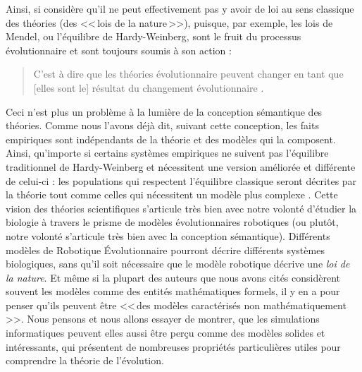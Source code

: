 Ainsi, si \cite{beatty1980whatswrongwithreceivedwiew} considère qu'il ne peut effectivement pas y avoir de loi au sens classique des théories (des <<\,lois de la nature\,>>), puisque, par exemple, les lois de Mendel, ou l'équilibre de Hardy-Weinberg, sont le fruit du processus évolutionnaire et sont toujours soumis à son action :
\begin{quote}
	C'est à dire que les théories évolutionnaire peuvent changer en tant que [elles sont le] résultat du changement évolutionnaire \citep[p.~407]{beatty1980whatswrongwithreceivedwiew}.
\end{quote}
Ceci n'est plus un problème à la lumière de la conception sémantique des théories. Comme nous l'avons déjà dit, suivant cette conception, les faits empiriques sont indépendants de la théorie et des modèles qui la composent. Ainsi, qu'importe si certains systèmes empiriques ne suivent pas l'équilibre traditionnel de Hardy-Weinberg et nécessitent une version améliorée et différente de celui-ci : les populations qui respectent l'équilibre classique seront décrites par la théorie tout comme celles qui nécessitent un modèle plus complexe \citep[p.~410-411]{beatty1980whatswrongwithreceivedwiew}.
Cette vision des théories scientifiques s'articule très bien avec notre volonté d'étudier la biologie à travers le prisme de modèles évolutionnaires robotiques (ou plutôt, notre volonté s'articule très bien avec la conception sémantique). Différents modèles de Robotique \'Evolutionnaire pourront décrire différents systèmes biologiques, sans qu'il soit nécessaire que le modèle robotique décrive une \emph{loi de la nature}. Et même si la plupart des auteurs que nous avons cités considèrent souvent les modèles comme des entités mathématiques formels, il y en a pour penser qu'ils peuvent être <<\,des modèles caractérisés non mathématiquement\,>>\citep[p. 1]{lloyd1988thesemanticapproachanditsapplicationtoevolutionarytheory}. Nous pensons et nous allons essayer de montrer, que les simulations informatiques peuvent elles aussi être perçu comme des modèles solides et intéressants, qui présentent de nombreuses propriétés particulières utiles pour comprendre la théorie de l'évolution.

